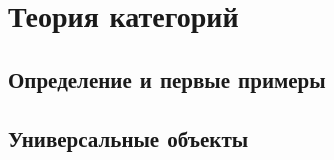 \section{Теория категорий}
\subsection{Определение и первые примеры}
\subsection{Универсальные объекты}